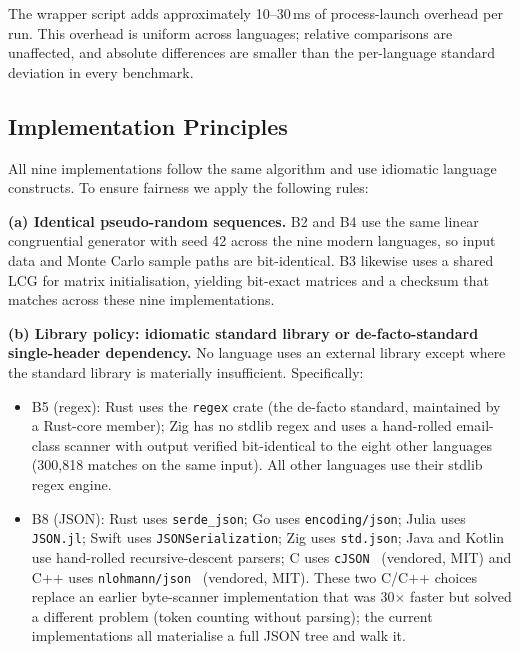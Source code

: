 \documentclass[10pt,conference]{IEEEtran}
\begin{document}
The wrapper script adds approximately 10--30\,ms of process-launch
overhead per run. This overhead is uniform across languages;
relative comparisons are unaffected, and absolute differences are
smaller than the per-language standard deviation in every
benchmark.

\subsection{Implementation Principles}
\label{sec:method-impl}

All nine implementations follow the same algorithm and use
idiomatic language constructs. To ensure fairness we apply the
following rules:

\textbf{(a) Identical pseudo-random sequences.} B2 and B4 use the
same linear congruential generator with seed 42 across the nine
modern languages, so input data and Monte Carlo sample paths are
bit-identical. B3 likewise uses a shared LCG for matrix
initialisation, yielding bit-exact matrices and a checksum that
matches across these nine implementations.

\textbf{(b) Library policy: idiomatic standard library or
de-facto-standard single-header dependency.} No language uses an
external library except where the standard library is materially
insufficient. Specifically:
\begin{itemize}
    \item B5 (regex): Rust uses the \texttt{regex} crate (the
          de-facto standard, maintained by a Rust-core member);
          Zig has no stdlib regex and uses a hand-rolled
          email-class scanner with output verified bit-identical to
          the eight other languages (300{,}818 matches on the same
          input). All other languages use their stdlib regex
          engine.
    \item B8 (JSON): Rust uses \texttt{serde\_json}; Go uses
          \texttt{encoding/json}; Julia uses \texttt{JSON.jl};
          Swift uses \texttt{JSONSerialization}; Zig uses
          \texttt{std.json}; Java and Kotlin use hand-rolled
          recursive-descent parsers; C uses
          \texttt{cJSON}~\cite{cjson} (vendored, MIT) and C++
          uses \texttt{nlohmann/json}~\cite{nlohmannjson} (vendored,
          MIT). These two C/C++ choices replace an earlier
          byte-scanner implementation that was 30$\times$ faster but
          solved a different problem (token counting without
          parsing); the current implementations all materialise a
          full JSON tree and walk it.
\end{itemize}
\end{document}
